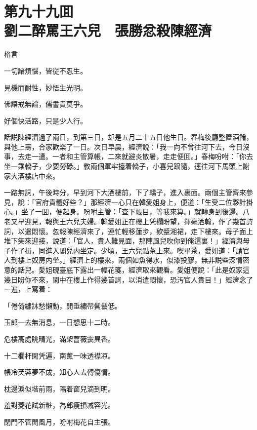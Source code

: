 
\chapter*{第九十九囬　\\劉二醉罵王六兒　張勝忿殺陳經濟}


格言

\begin{myquote}
一切諸煩惱，皆従不忍生。

見機而耐性，妙悟生光明。

佛語戒無論，儒書貴莫爭。

好個快活路，只是少人行。
\end{myquote}

話説陳經濟過了兩日，到第三日，却是五月二十五日他生日。春梅後廳整置酒餚，與他上壽，合家歡楽了一日。次日早晨，經濟說：「我一向不曾往河下去，今日沒事，去走一遭。一者和主管算帳，二來就避炎散暑，走走便囬。」春梅吩咐：「你去坐一乘轎子，少要勞碌。」敎兩個軍牢擡着轎子，小喜兒跟隨，逕往河下馬頭上謝家大酒樓店中來。

一路無詞，午後時分，早到河下大酒樓前，下了轎子，進入裏面。兩個主管齊來參見，說：「官府貴體好些？」那經濟一心只在韓愛姐身上，便道：「生受二位夥計掛心。」坐了一囬，便起身。吩咐主管：「查下帳目，等我來算。」就轉身到後邊。八老又早迎見，報與王六兒夫婦。韓愛姐正在樓上凭欄盼望，揮毫洒翰，作了幾首詩詞，以遣悶懷。忽報陳經濟來了，連忙輕移蓮步，欵蹙湘裙，走下樓來。母子面上堆下笑來迎接，說道：「官人，貴人難見面，那陣風兒吹你到俺這裏！」經濟與母子作了揖，同進入閣兒内坐定。少頃，王六兒點茶上來。喫畢茶，愛姐道：「請官人到樓上奴房内坐。」經濟上的樓來，兩個如魚得水，似漆投膠，無非説些深情密意的話兒。愛姐硯臺底下露出一幅花箋，經濟取來觀看。愛姐便說：「此是奴家這幾日盼你不來，閑中在樓上作得幾首詞，以消遣悶懷，恐汚官人貴目！」經濟念了一遍，上寫着：

\begin{myquote}
「倦倚繡牀愁懶動，閒垂繡帶鬢鬟低。

玉郎一去無消息，一日想思十二時。


危樓高處眺晴光，滿架薔薇靄異香。

十二欄杆閑凭遍，南薰一味透襟凉。


帳冷芙蓉夢不成，知心人去轉傷情。

枕邊淚似堦前雨，隔着窗兒滴到明。


羞對菱花試新粧，為郎瘦損减容光。

閉門不管閒風月，吩咐梅花自主張。

\end{myquote}

